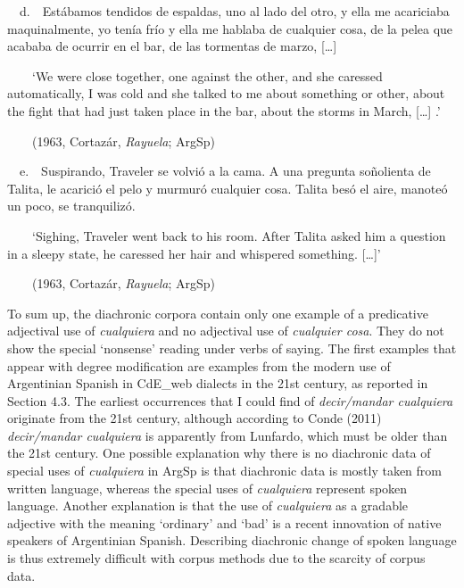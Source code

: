 \begin{styleStandard}
\ \ d.\ \ Estábamos tendidos de espaldas, uno al lado del otro, y ella me acariciaba maquinalmente, yo tenía frío y ella me hablaba de cualquier cosa, de la pelea que acababa de ocurrir en el bar, de las tormentas de marzo, […]
\end{styleStandard}

\begin{styleStandard}
\ \ \ \ ‘We were close together, one against the other, and she caressed automatically, I was cold and she talked to me about something or other, about the fight that had just taken place in the bar, about the storms in March, […] .’
\end{styleStandard}

\begin{styleStandard}
\ \ \ \ (1963, Cortazár, \textit{Rayuela}; ArgSp)
\end{styleStandard}

\begin{styleStandard}
\ \ e.\ \ Suspirando, Traveler se volvió a la cama. A una pregunta soñolienta de Talita, le acarició el pelo y murmuró cualquier cosa. Talita besó el aire, manoteó un poco, se tranquilizó.
\end{styleStandard}

\begin{styleStandard}
\ \ \ \ ‘Sighing, Traveler went back to his room. After Talita asked him a question in a sleepy state, he caressed her hair and whispered something. […]’
\end{styleStandard}

\begin{styleStandard}
\ \ \ \ (1963, Cortazár, \textit{Rayuela}; ArgSp)
\end{styleStandard}

\begin{styleStandard}
To sum up, the diachronic corpora contain only one example of a predicative adjectival use of \textit{cualquiera} and no adjectival use of \textit{cualquier cosa}. They do not show the special ‘nonsense’ reading under verbs of saying. The first examples that appear with degree modification are examples from the modern use of Argentinian Spanish in CdE\_web dialects in the 21st century, as reported in Section 4.3. The earliest occurrences that I could find of \textit{decir/mandar cualquiera} originate from the 21st century, although according to Conde (2011) \textit{decir/mandar cualquiera} is apparently from Lunfardo, which must be older than the 21st century. One possible explanation why there is no diachronic data of special uses of \textit{cualquiera} in ArgSp is that diachronic data is mostly taken from written language, whereas the special uses of \textit{cualquiera} represent spoken language. Another explanation is that the use of \textit{cualquiera} as a gradable adjective with the meaning ‘ordinary’ and ‘bad’ is a recent innovation of native speakers of Argentinian Spanish. Describing diachronic change of spoken language is thus extremely difficult with corpus methods due to the scarcity of corpus data.
\end{styleStandard}

